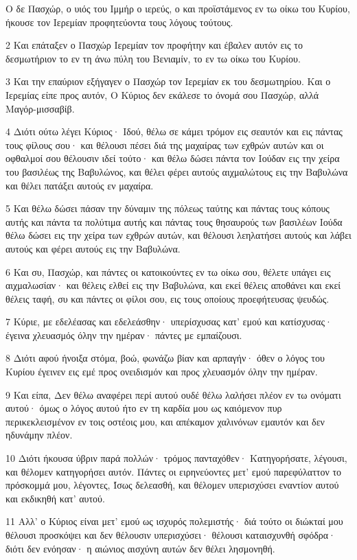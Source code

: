 \par Ο δε Πασχώρ, ο υιός του Ιμμήρ ο ιερεύς, ο και προϊστάμενος εν τω οίκω του Κυρίου, ήκουσε τον Ιερεμίαν προφητεύοντα τους λόγους τούτους.
\par 2 Και επάταξεν ο Πασχώρ Ιερεμίαν τον προφήτην και έβαλεν αυτόν εις το δεσμωτήριον το εν τη άνω πύλη του Βενιαμίν, το εν τω οίκω του Κυρίου.
\par 3 Και την επαύριον εξήγαγεν ο Πασχώρ τον Ιερεμίαν εκ του δεσμωτηρίου. Και ο Ιερεμίας είπε προς αυτόν, Ο Κύριος δεν εκάλεσε το όνομά σου Πασχώρ, αλλά Μαγόρ-μισσαβίβ.
\par 4 Διότι ούτω λέγει Κύριος· Ιδού, θέλω σε κάμει τρόμον εις σεαυτόν και εις πάντας τους φίλους σου· και θέλουσι πέσει διά της μαχαίρας των εχθρών αυτών και οι οφθαλμοί σου θέλουσιν ιδεί τούτο· και θέλω δώσει πάντα τον Ιούδαν εις την χείρα του βασιλέως της Βαβυλώνος, και θέλει φέρει αυτούς αιχμαλώτους εις την Βαβυλώνα και θέλει πατάξει αυτούς εν μαχαίρα.
\par 5 Και θέλω δώσει πάσαν την δύναμιν της πόλεως ταύτης και πάντας τους κόπους αυτής και πάντα τα πολύτιμα αυτής και πάντας τους θησαυρούς των βασιλέων Ιούδα θέλω δώσει εις την χείρα των εχθρών αυτών, και θέλουσι λεηλατήσει αυτούς και λάβει αυτούς και φέρει αυτούς εις την Βαβυλώνα.
\par 6 Και συ, Πασχώρ, και πάντες οι κατοικούντες εν τω οίκω σου, θέλετε υπάγει εις αιχμαλωσίαν· και θέλεις ελθεί εις την Βαβυλώνα, και εκεί θέλεις αποθάνει και εκεί θέλεις ταφή, συ και πάντες οι φίλοι σου, εις τους οποίους προεφήτευσας ψευδώς.
\par 7 Κύριε, με εδελέασας και εδελεάσθην· υπερίσχυσας κατ' εμού και κατίσχυσας· έγεινα χλευασμός όλην την ημέραν· πάντες με εμπαίζουσι.
\par 8 Διότι αφού ήνοιξα στόμα, βοώ, φωνάζω βίαν και αρπαγήν· όθεν ο λόγος του Κυρίου έγεινεν εις εμέ προς ονειδισμόν και προς χλευασμόν όλην την ημέραν.
\par 9 Και είπα, Δεν θέλω αναφέρει περί αυτού ουδέ θέλω λαλήσει πλέον εν τω ονόματι αυτού· όμως ο λόγος αυτού ήτο εν τη καρδία μου ως καιόμενον πυρ περικεκλεισμένον εν τοις οστέοις μου, και απέκαμον χαλινόνων εμαυτόν και δεν ηδυνάμην πλέον.
\par 10 Διότι ήκουσα ύβριν παρά πολλών· τρόμος πανταχόθεν· Κατηγορήσατε, λέγουσι, και θέλομεν κατηγορήσει αυτόν. Πάντες οι ειρηνεύοντες μετ' εμού παρεφύλαττον το πρόσκομμά μου, λέγοντες, Ίσως δελεασθή, και θέλομεν υπερισχύσει εναντίον αυτού και εκδικηθή κατ' αυτού.
\par 11 Αλλ' ο Κύριος είναι μετ' εμού ως ισχυρός πολεμιστής· διά τούτο οι διώκταί μου θέλουσι προσκόψει και δεν θέλουσιν υπερισχύσει· θέλουσι καταισχυνθή σφόδρα· διότι δεν ενόησαν· η αιώνιος αισχύνη αυτών δεν θέλει λησμονηθή.
